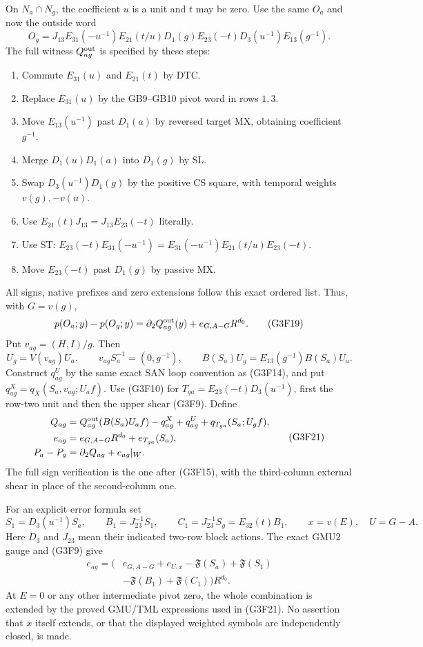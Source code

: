 On $N_a\cap N_g$, the coefficient $u$ is a unit and $t$ may be zero.
Use the same $O_a$ and now the outside word
\[
 O_g=J_{13}E_{31}(-u^{-1})E_{21}(t/u)D_1(g)
                     E_{23}(-t)D_3(u^{-1})E_{13}(g^{-1}).
 \tag{G3F18}
\]
The full witness $Q^{\rm out}_{ag}$ is specified by these steps:
\begin{enumerate}
\item Commute $E_{31}(u)$ and $E_{21}(t)$ by DTC.
\item Replace $E_{31}(u)$ by the GB9--GB10 pivot word in rows $1,3$.
\item Move $E_{13}(u^{-1})$ past $D_1(a)$ by reversed target MX,
      obtaining coefficient $g^{-1}$.
\item Merge $D_1(u)D_1(a)$ into $D_1(g)$ by SL.
\item Swap $D_3(u^{-1})D_1(g)$ by the positive CS square, with
      temporal weights $v(g),-v(u)$.
\item Use $E_{21}(t)J_{13}=J_{13}E_{23}(-t)$ literally.
\item Use ST:
      $E_{23}(-t)E_{31}(-u^{-1})
       =E_{31}(-u^{-1})E_{21}(t/u)E_{23}(-t)$.
\item Move $E_{23}(-t)$ past $D_1(g)$ by passive MX.
\end{enumerate}
All signs, native prefixes and zero extensions follow this exact
ordered list.  Thus, with $G=v(g)$,
\[
 p(O_a;y)-p(O_g;y)
           =\partial_2Q^{\rm out}_{ag}(y)+e_{G,A-G}R^{d_0}.
 \tag{G3F19}
\]
Put $v_{ag}=(H,I)/g$.  Then
\[
 U_g=V(v_{ag})U_a,\qquad
 v_{ag}S_a^{-1}=(0,g^{-1}),\qquad
 B(S_a)U_g=E_{13}(g^{-1})B(S_a)U_a.
 \tag{G3F20}
\]
Construct $q^U_{ag}$ by the same exact SAN loop convention as
(G3F14), and put $q^X_{ag}=q_X(S_a,v_{ag};U_af)$.
Use (G3F10) for $T_{ga}=E_{23}(-t)D_3(u^{-1})$, first the row-two
unit and then the upper shear (G3F9).  Define
\[
 \begin{split}
 Q_{ag}&=Q^{\rm out}_{ag}(B(S_a)U_af)-q^X_{ag}
                           +q^U_{ag}+q_{T_{ga}}(S_a;U_gf),\\
 e_{ag}&=e_{G,A-G}R^{d_0}+e_{T_{ga}}(S_a),\\
                         P_a-P_g&=\partial_2Q_{ag}+e_{ag}|_W.
 \end{split}
 \tag{G3F21}
\]
The full sign verification is the one after (G3F15), with the
third-column external shear in place of the second-column one.

For an explicit error formula set
\[
 S_1=D_3(u^{-1})S_a,\qquad B_1=J_{23}^{-1}S_1,\qquad
 C_1=J_{23}^{-1}S_g=E_{32}(t)B_1,\qquad x=v(E),\quad U=G-A.
 \tag{G3F22}
\]
Here $D_3$ and $J_{23}$ mean their indicated two-row block actions.
The exact GMU2 gauge and (G3F9) give
\[
 \begin{split}
 e_{ag}=\bigl(&e_{G,A-G}+e_{U,x}-\mathfrak F(S_a)
                     +\mathfrak F(S_1)\\
              &-\mathfrak F(B_1)+\mathfrak F(C_1)\bigr)R^{d_0}.
 \end{split}
 \tag{G3F23}
\]
At $E=0$ or any other intermediate pivot zero, the whole combination
is extended by the proved GMU/TML expressions used in (G3F21).
No assertion that $x$ itself extends, or that the displayed weighted
symbols are independently closed, is made.

